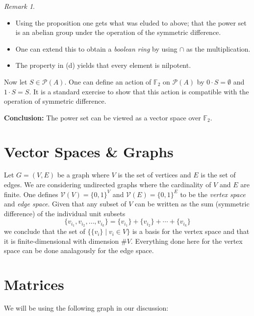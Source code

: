\documentclass[10pt, letterpaper]{article}
\newcommand{\field}[1]{\mathbb{#1}}
\theoremstyle{remark}
\newtheorem{rem}{Remark}
\theoremstyle{definition}
\begin{document}
\begin{rem} \leavevmode
	\begin{itemize}
		\item Using the proposition one gets what was eluded to above; that the power set is an abelian group under the operation of the symmetric difference.
		\item One can extend this to obtain a \textit{boolean ring} by using $\cap$ as the multiplication.
		\item The property in (d) yields that every element is nilpotent.
	\end{itemize}
\end{rem}

Now let $S \in \mathcal{P}(A)$. One can define an action of $\field{F}_2$ on $\mathcal{P}(A)$ by $0 \cdot S = \emptyset$ and $1 \cdot S = S$. It is a standard exercise to show that this action is compatible with the operation of symmetric difference. 

\hspace*{.15in}

\textbf{Conclusion: } The power set can be viewed as a vector space over $\field{F}_2$.

\section{Vector Spaces \& Graphs}

Let $G = (V,E)$ be a graph where $V$ is the set of vertices and $E$ is the set of edges. We are considering undirected graphs where the cardinality of $V$ and $E$ are finite. One defines $\mathcal{V}(V) = \{0,1\}^V$ and $\mathcal{V}(E) = \{0,1\}^E$ to be the \textit{vertex space} and \textit{edge space}. Given that any subset of $V$ can be written as the sum (symmetric difference) of the individual unit subsets
\[
	\{v_{i_1}, v_{i_2}, \ldots, v_{i_k}\} = \{v_{i_1}\} + \{v_{i_2}\} + \cdots + \{v_{i_k}\}
\]
we conclude that the set of $\{\{v_i\} \mid v_i \in V\}$ is a basis for the vertex space and that it is finite-dimensional with dimension \#$V$. Everything done here for the vertex space can be done analagously for the edge space.

\section{Matrices}

We will be using the following graph in our discussion:

\vspace*{.15in}
\end{document}
